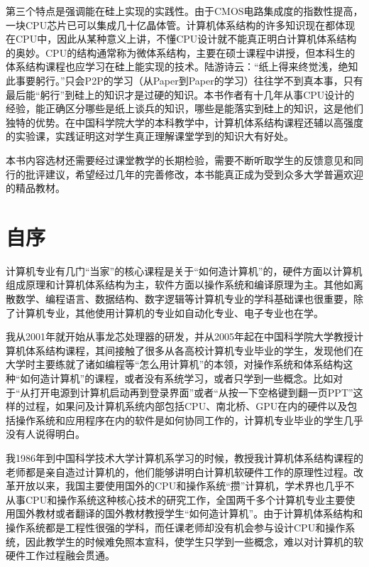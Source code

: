 \documentclass[]{ctexbook}
\begin{document}
第三个特点是强调能在硅上实现的实践性。由于CMOS电路集成度的指数性提高，一块CPU芯片已可以集成几十亿晶体管。计算机体系结构的许多知识现在都体现在CPU中，因此从某种意义上讲，不懂CPU设计就不能真正明白计算机体系结构的奥妙。CPU的结构通常称为微体系结构，主要在硕士课程中讲授，但本科生的体系结构课程也应学习在硅上能实现的技术。陆游诗云：``纸上得来终觉浅，绝知此事要躬行。''只会P2P的学习（从Paper到Paper的学习）往往学不到真本事，只有最后能``躬行''到硅上的知识才是过硬的知识。本书作者有十几年从事CPU设计的经验，能正确区分哪些是纸上谈兵的知识，哪些是能落实到硅上的知识，这是他们独特的优势。在中国科学院大学的本科教学中，计算机体系结构课程还辅以高强度的实验课，实践证明这对学生真正理解课堂学到的知识大有好处。

本书内容选材还需要经过课堂教学的长期检验，需要不断听取学生的反馈意见和同行的批评建议，希望经过几年的完善修改，本书能真正成为受到众多大学普遍欢迎的精品教材。

\newpage

\hypertarget{ux81eaux5e8f}{%
\chapter*{自序}\label{ux81eaux5e8f}}



计算机专业有几门``当家''的核心课程是关于``如何造计算机''的，硬件方面以计算机组成原理和计算机体系结构为主，软件方面以操作系统和编译原理为主。其他如离散数学、编程语言、数据结构、数字逻辑等计算机专业的学科基础课也很重要，除了计算机专业，其他使用计算机的专业如自动化专业、电子专业也在学。

我从2001年就开始从事龙芯处理器的研发，并从2005年起在中国科学院大学教授计算机体系结构课程，其间接触了很多从各高校计算机专业毕业的学生，发现他们在大学时主要练就了诸如编程等``怎么用计算机''的本领，对操作系统和体系结构这种``如何造计算机''的课程，或者没有系统学习，或者只学到一些概念。比如对于``从打开电源到计算机启动再到登录界面''或者``从按一下空格键到翻一页PPT''这样的过程，如果问及计算机系统内部包括CPU、南北桥、GPU在内的硬件以及包括操作系统和应用程序在内的软件是如何协同工作的，计算机专业毕业的学生几乎没有人说得明白。

我1986年到中国科学技术大学计算机系学习的时候，教授我计算机体系结构课程的老师都是亲自造过计算机的，他们能够讲明白计算机软硬件工作的原理性过程。改革开放以来，我国主要使用国外的CPU和操作系统``攒''计算机，学术界也几乎不从事CPU和操作系统这种核心技术的研究工作，全国两千多个计算机专业主要使用国外教材或者翻译的国外教材教授学生``如何造计算机''。由于计算机体系结构和操作系统都是工程性很强的学科，而任课老师却没有机会参与设计CPU和操作系统，因此教学生的时候难免照本宣科，使学生只学到一些概念，难以对计算机的软硬件工作过程融会贯通。
\end{document}
